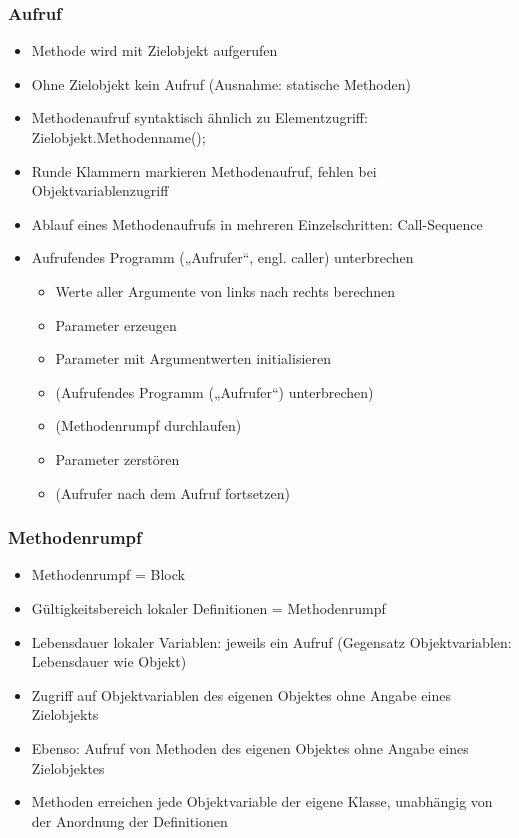 \subsubsection{Aufruf}
\begin{itemize}
\item Methode wird mit Zielobjekt aufgerufen
\item Ohne Zielobjekt kein Aufruf (Ausnahme: statische Methoden)
\item Methodenaufruf syntaktisch ähnlich zu Elementzugriff: Zielobjekt.Methodenname();
\item Runde Klammern markieren Methodenaufruf, fehlen bei Objektvariablenzugriff
\item Ablauf eines Methodenaufrufs in mehreren Einzelschritten: Call-Sequence
\item Aufrufendes Programm („Aufrufer“, engl. caller) unterbrechen
\begin{itemize}
	\item Werte aller Argumente von links nach rechts berechnen
	\item Parameter erzeugen
	\item Parameter mit Argumentwerten initialisieren
	\item (Aufrufendes Programm („Aufrufer“) unterbrechen)
	\item (Methodenrumpf durchlaufen)
	\item Parameter zerstören
	\item (Aufrufer nach dem Aufruf fortsetzen)
\end{itemize}
\end{itemize}
\subsubsection{Methodenrumpf}
\begin{itemize}
\item Methodenrumpf = Block
\item Gültigkeitsbereich lokaler Definitionen = Methodenrumpf
\item Lebensdauer lokaler Variablen: jeweils ein Aufruf (Gegensatz Objektvariablen: Lebensdauer wie Objekt)
\item Zugriff auf Objektvariablen des eigenen Objektes ohne Angabe eines Zielobjekts
\item Ebenso: Aufruf von Methoden des eigenen Objektes ohne Angabe eines Zielobjektes
\item Methoden erreichen jede Objektvariable der eigene Klasse, unabhängig von der Anordnung der Definitionen
\end{itemize}
